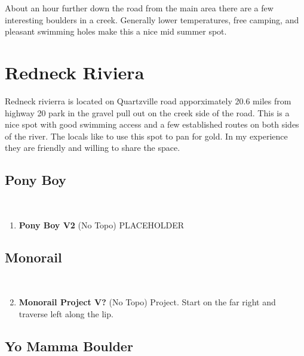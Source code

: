 \begin{multicols*}{2}
About an hour further down the road from the main area there are a few interesting boulders in a creek. Generally lower temperatures, free camping, and pleasant swimming holes make this a nice mid summer spot.

		\section{Redneck Riviera}\label{sa:Redneck Riviera}
	Redneck rivierra is located on Quartzville road apporximately 20.6 miles from highway 20 park in the gravel pull out on the creek side of the road. This is a nice spot with good swimming access and a few established routes on both sides of the river. The locals like to use this spot to pan for gold. In my experience they are friendly and willing to share the space.
			\subsection*{Pony Boy}\label{bf:Pony Boy}
			\
			
				\begin{enumerate}[]
					\setcounter{enumi}{0}
					\item\label{rt:Pony Boy} \colorbox{green!20}{\textbf{Pony Boy V2  } }
						\newline (No Topo) 
					\newline PLACEHOLDER\
				\end{enumerate}
			\subsection*{Monorail}\label{bf:Monorail}
			\
			
				\begin{enumerate}[]
					\setcounter{enumi}{1}
					\item\label{rt:Monorail Project} \colorbox{black!20}{\textbf{Monorail Project V?  } }
						\newline (No Topo) 
					\newline Project. Start on the far right and traverse left along the lip.\
				\end{enumerate}
			\subsection*{Yo Mamma Boulder}\label{bf:Yo Mamma Boulder}
			\
			

\end{multicols*}
